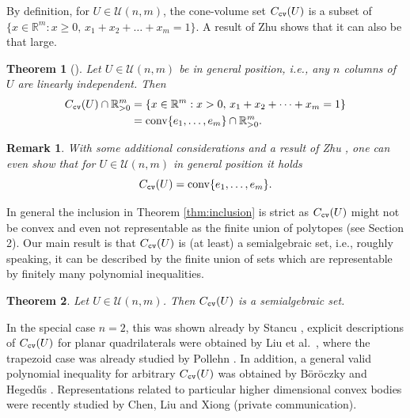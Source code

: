 \documentclass[11pt, a4paper, twoside, reqno]{amsart}
\DeclareMathOperator*{\conv}{conv}
\newcommand{\R}{\mathbb{R}}
\newtheorem{theorem}{Theorem}[section] %
\newtheorem{remark}[theorem]{Remark}
\newtheorem{theoman}{Theorem}[section]
\theoremstyle{definition}
\theoremstyle{remark}
\newcommand{\cv}{{\tt cv}}
\numberwithin{equation}{section}
\begin{document}
By definition, for $U\in\mathcal{U}(n,m)$, the cone-volume set $C_\cv(U)$ is a subset of $\{x\in\R^{m}: x\geq 0, \, x_1+x_2+\dots + x_m=1\}$. A result of Zhu shows that it can also be that large.
\begin{theoman}[] Let  $U\in\mathcal{U}(n,m)$ be in general position, i.e., any $n$ columns of $U$ are linearly independent. Then 
  \begin{equation*}
    \begin{split} 
      C_\cv(U) \cap\R^m_{>0} &= \left\{x\in\R^{m}:  x>0,\, x_1+x_2+\dots + x_{m}=1\right\}\\ & = \conv\{e_1,\dots,e_m\}\cap\R^m_{>0} .
   \end{split}   
  \end{equation*}
\label{thm:zhu}  
\end{theoman}

\begin{remark} With some additional considerations and  a result of Zhu \cite[Theorem 4.3]{Zhu2014}, one can even show that for  $U\in\mathcal{U}(n,m)$ in general position it holds
  \begin{equation*}
     C_\cv(U) = \conv\{e_1,\dots,e_m\}.
   \end{equation*}
\end{remark}   

In general the inclusion in Theorem \ref{thm:inclusion} is strict as
$C_\cv(U)$ might not be convex and even not representable as the finite union of
polytopes (see Section 2). Our main result is that  $C_\cv(U)$ is (at least) a semialgebraic set, i.e., roughly speaking, it can be described by the finite union of sets which are representable by finitely many polynomial inequalities.

\begin{theorem} Let  $U\in\mathcal{U}(n,m)$. Then $C_\cv(U)$ is a semialgebraic set.
  \label{thm:main}  
\end{theorem}
In the special case  $n=2$, this was shown already by Stancu \cite{stancu2002discrete},
explicit descriptions of $C_\cv(U)$
for planar quadrilaterals were obtained by Liu et al.~\cite{LiuLuSunEtAl2024}, where the trapezoid case was already studied by Pollehn \cite[Section 2.4]{Subspace_Concentration_of_Geometric_Measures}.
In addition, a general valid polynomial inequality for arbitrary $C_\cv(U)$ was obtained by Böröczky and Heged{\H u}s \cite{BoeroeczkyHegedues2015}. 
Representations related to particular higher dimensional convex bodies were recently studied by Chen, Liu and Xiong (private communication). 
\end{document}
